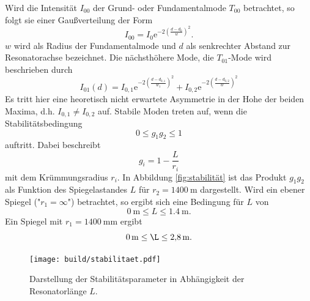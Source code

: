 Wird die Intensität $I_{00}$ der Grund- oder Fundamentalmode $T_{00}$ betrachtet, so
folgt sie einer Gaußverteilung der Form
\begin{equation}
  I_{00} = I_0 \text{e}^{-2\left(\frac{d-d_0}{w}\right)^2}.
\end{equation}
$w$ wird als Radius der Fundamentalmode und $d$ als senkrechter Abstand zur Resonatorachse
bezeichnet. Die nächsthöhere Mode, die $T_{01}$-Mode wird beschrieben durch
\begin{equation}
  I_{01}(d) = I_{0,1}\text{e}^{-2\left(\frac{d-d_{0,1}}{w_1}\right)^2}+I_{0,2}\text{e}^{-2\left(\frac{d-d_{0,2}}{w}\right)^2}
\end{equation}
Es tritt hier eine heoretisch nicht erwartete Asymmetrie in der Hohe der beiden Maxima,
d.h. $I_{0,1} \neq I_{0,2}$ auf.
Stabile Moden treten auf, wenn die Stabilitätsbedingung
\begin{equation}
  0\leq g_1g_2\leq 1
\end{equation}
auftritt. Dabei beschreibt
\begin{equation}
  g_i = 1 - \frac{L}{r_i}
\end{equation}
mit dem Krümmungsradius $r_i$. In Abbildung \ref{fig:stabilität} ist das Produkt $g_1g_2$
als Funktion des Spiegelastandes $L$  für $r_2 = \SI{1400}{\metre}$ dargestellt. Wird ein
ebener Spiegel ("$r_1 = \infty$") betrachtet, so ergibt sich eine Bedingung für
$L$ von
\begin{equation}
  \SI{0}{\metre} \leq L \leq \SI{1.4}{\metre}.
\end{equation}
Ein Spiegel mit $r_1 = \SI{1400}{\milli\metre}$ ergibt
\begin{equation}
    \SI{0}{\metre} \leq \L \leq \SI{2.8}{\metre}.
\end{equation}

\begin{figure}
  \centering
  \texttt{[image: build/stabilitaet.pdf]}
  \caption{Darstellung der Stabilitätsparameter in Abhängigkeit der
  Resonatorlänge $L$.}
  \label{fig:Stabilität}
\end{figure}

